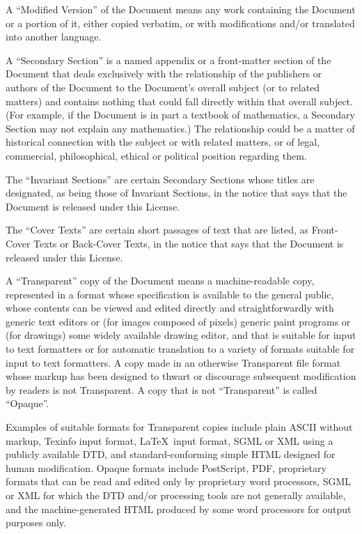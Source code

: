 A ``Modified Version'' of the Document means any work containing the
Document or a portion of it, either copied verbatim, or with
modifications and/or translated into another language.

A ``Secondary Section'' is a named appendix or a front-matter section of
the Document that deals exclusively with the relationship of the
publishers or authors of the Document to the Document's overall subject
(or to related matters) and contains nothing that could fall directly
within that overall subject.  (For example, if the Document is in part a
textbook of mathematics, a Secondary Section may not explain any
mathematics.)  The relationship could be a matter of historical
connection with the subject or with related matters, or of legal,
commercial, philosophical, ethical or political position regarding
them.

The ``Invariant Sections'' are certain Secondary Sections whose titles
are designated, as being those of Invariant Sections, in the notice
that says that the Document is released under this License.

The ``Cover Texts'' are certain short passages of text that are listed,
as Front-Cover Texts or Back-Cover Texts, in the notice that says that
the Document is released under this License.

A ``Transparent'' copy of the Document means a machine-readable copy,
represented in a format whose specification is available to the
general public, whose contents can be viewed and edited directly and
straightforwardly with generic text editors or (for images composed of
pixels) generic paint programs or (for drawings) some widely available
drawing editor, and that is suitable for input to text formatters or
for automatic translation to a variety of formats suitable for input
to text formatters.  A copy made in an otherwise Transparent file
format whose markup has been designed to thwart or discourage
subsequent modification by readers is not Transparent.  A copy that is
not ``Transparent'' is called ``Opaque''.

Examples of suitable formats for Transparent copies include plain
ASCII without markup, Texinfo input format, \LaTeX~input format, SGML
or XML using a publicly available DTD, and standard-conforming simple
HTML designed for human modification.  Opaque formats include
PostScript, PDF, proprietary formats that can be read and edited only
by proprietary word processors, SGML or XML for which the DTD and/or
processing tools are not generally available, and the
machine-generated HTML produced by some word processors for output
purposes only.

